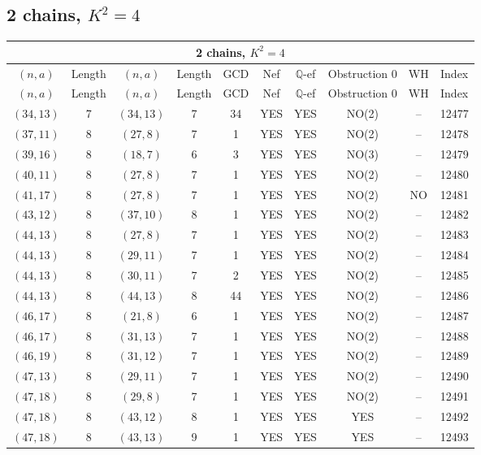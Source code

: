 \subsection{2 chains, \(K^2 = 4\)}
\begin{longtable}{|c|c|c|c|c|c|c|c|c|c|}
\hline
\multicolumn{10}{|c|}{2 chains, $K^2 = 4$}\\
\hline
$(n,a)$ & Length & $(n,a)$ & Length & GCD & Nef & $\mathbb Q$-ef & Obstruction 0 & WH & Index\\
\hline
\endfirsthead

\hline
$(n,a)$ & Length & $(n,a)$ & Length & GCD & Nef & $\mathbb Q$-ef & Obstruction 0 & WH & Index\\
\hline
\endhead
\hline
\endfoot

$(34, 13)$ & 7 & $(34, 13)$ & 7 & 34 & YES & YES & NO(2) & -- & 12477\\
$(37, 11)$ & 8 & $(27, 8)$ & 7 & 1 & YES & YES & NO(2) & -- & 12478\\
$(39, 16)$ & 8 & $(18, 7)$ & 6 & 3 & YES & YES & NO(3) & -- & 12479\\
$(40, 11)$ & 8 & $(27, 8)$ & 7 & 1 & YES & YES & NO(2) & -- & 12480\\
$(41, 17)$ & 8 & $(27, 8)$ & 7 & 1 & YES & YES & NO(2) & NO & 12481\\
$(43, 12)$ & 8 & $(37, 10)$ & 8 & 1 & YES & YES & NO(2) & -- & 12482\\
$(44, 13)$ & 8 & $(27, 8)$ & 7 & 1 & YES & YES & NO(2) & -- & 12483\\
$(44, 13)$ & 8 & $(29, 11)$ & 7 & 1 & YES & YES & NO(2) & -- & 12484\\
$(44, 13)$ & 8 & $(30, 11)$ & 7 & 2 & YES & YES & NO(2) & -- & 12485\\
$(44, 13)$ & 8 & $(44, 13)$ & 8 & 44 & YES & YES & NO(2) & -- & 12486\\
$(46, 17)$ & 8 & $(21, 8)$ & 6 & 1 & YES & YES & NO(2) & -- & 12487\\
$(46, 17)$ & 8 & $(31, 13)$ & 7 & 1 & YES & YES & NO(2) & -- & 12488\\
$(46, 19)$ & 8 & $(31, 12)$ & 7 & 1 & YES & YES & NO(2) & -- & 12489\\
$(47, 13)$ & 8 & $(29, 11)$ & 7 & 1 & YES & YES & NO(2) & -- & 12490\\
$(47, 18)$ & 8 & $(29, 8)$ & 7 & 1 & YES & YES & NO(2) & -- & 12491\\
$(47, 18)$ & 8 & $(43, 12)$ & 8 & 1 & YES & YES & YES & -- & 12492\\
$(47, 18)$ & 8 & $(43, 13)$ & 9 & 1 & YES & YES & YES & -- & 12493\\

\end{longtable}
